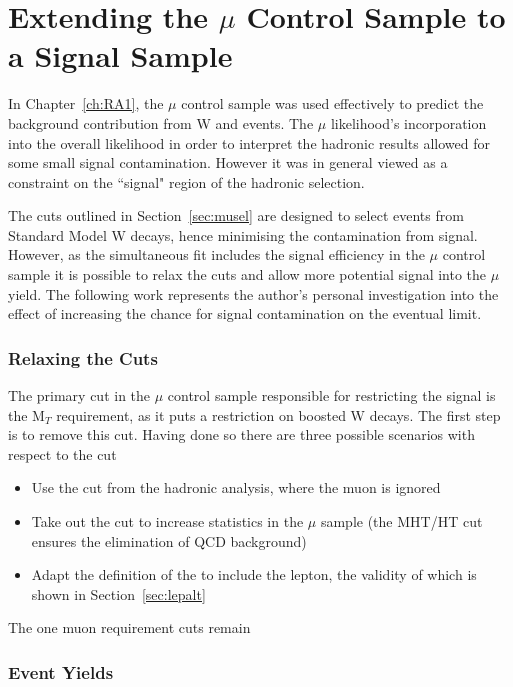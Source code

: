 \chapter{Extending the $\mu$ Control Sample to a Signal Sample}

In Chapter~\ref{ch:RA1}, the $\mu$ control sample was used effectively to predict the background contribution from W and \tto events. The $\mu$ likelihood's incorporation into the overall likelihood in order to interpret the hadronic results allowed for some small signal contamination. However it was in general viewed as a constraint on the ``signal" region of the hadronic selection. 

The cuts outlined in Section~\ref{sec:musel} are designed to select events from Standard Model W decays, hence minimising the contamination from signal. However, as the simultaneous fit includes the signal efficiency in the $\mu$ control sample it is possible to relax the cuts and allow more potential signal into the $\mu$ yield. The following work represents the author's personal investigation into the effect of increasing the chance for signal contamination on the eventual limit. 

\subsection{Relaxing the Cuts}

The primary cut in the $\mu$ control sample responsible for restricting the signal is the M$_{T}$ requirement, as it puts a restriction on boosted W decays. The first step is to remove this cut. Having done so there are three possible scenarios with respect to the \alt cut

\begin{itemize}
\item Use the \alt cut from the hadronic analysis, where the muon is ignored
\item Take out the \alt cut to increase statistics in the $\mu$ sample (the MHT/HT cut ensures the elimination of QCD background)
\item Adapt the definition of the \alt to include the lepton, the validity of which is shown in Section~\ref{sec:lepalt}
\end{itemize}

The one muon requirement cuts remain 

\subsection{Event Yields}
